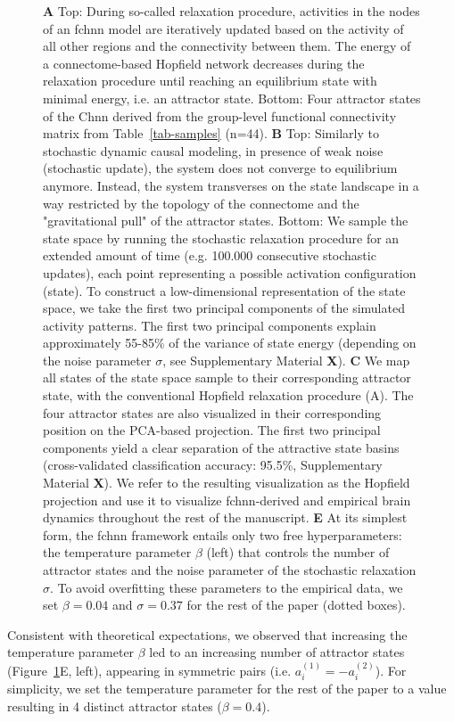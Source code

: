 \documentclass{article}
\begin{document}
\begin{figure}[!htbp]
{\textbf{A} Top: During so-called relaxation procedure, activities in the nodes of an \acrshort{fchnn} model are iteratively updated based on the activity of all other regions and the connectivity between them. The energy of a
connectome-based Hopfield network decreases during the relaxation procedure until reaching an equilibrium state with
minimal energy, i.e. an attractor state. Bottom: Four attractor states of the C\acrshort{hnn} derived from the
group-level functional connectivity matrix from Table~\ref{tab-samples} (n=44).
\textbf{B} Top: Similarly to stochastic dynamic causal modeling, in presence of weak noise (stochastic update), the system
does not converge to equilibrium anymore. Instead, the system transverses on the state landscape in a way
restricted by the topology of the connectome and the "gravitational pull" of the attractor states. Bottom: We sample
the state space by running the stochastic relaxation procedure for an extended amount of time (e.g. 100.000 consecutive
stochastic updates), each point representing a possible activation configuration (state). To construct a
low-dimensional representation of the state space, we take the first two principal components of the simulated activity
patterns. The first two principal components explain approximately 55-85\% of the variance of state energy (depending
on the noise parameter $\sigma$, see Supplementary Material \textbf{X}).
\textbf{C} We map all states of the state space sample to their corresponding attractor state, with the conventional
Hopfield relaxation procedure (A). The four attractor states are also visualized in their corresponding position on the
PCA-based projection. The first two principal components yield a clear separation of the attractive state basins
(cross-validated classification accuracy: 95.5\%, Supplementary Material \textbf{X}). We refer to the resulting visualization
as the Hopfield projection and use it to visualize \acrshort{fchnn}-derived and empirical brain dynamics throughout the rest of
the manuscript.
\textbf{E} At its simplest form, the \acrshort{fchnn} framework entails only two free hyperparameters: the temperature parameter
$\beta$ (left) that controls the number of attractor states and the noise parameter of the stochastic relaxation
$\sigma$. To avoid overfitting these parameters to the empirical data, we set $\beta=0.04$ and $\sigma=0.37$ for the
rest of the paper  (dotted boxes).}
\label{attractors}
\end{figure}

Consistent with theoretical expectations, we observed that increasing the temperature parameter $\beta$ led to an
increasing number of attractor states (Figure~\ref{attractors}E, left), appearing in symmetric pairs
(i.e. $a_i^{(1)} = -a_i^{(2)}$). For simplicity, we set the temperature parameter for the rest of the paper to a value
resulting in 4 distinct attractor states ($\beta=0.4$).
\end{document}
